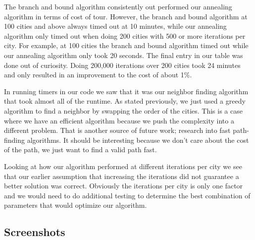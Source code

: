 \documentclass{article}
\begin{document}
    \begin{multicols}{2}
        The branch and bound algorithm consistently out performed our annealing algorithm in terms of cost of tour. However, the branch and bound algorithm at 100 cities and above always timed out at 10 minutes, while our annealing algorithm only timed out when doing 200 cities with 500 or more iterations per city. For example, at 100 cities the branch and bound algorithm timed out while our annealing algorithm only took 20 seconds. The final entry in our table was done out of curiosity. Doing 200,000 iterations over 200 cities took 24 minutes and only resulted in an improvement to the cost of about 1\%.

        In running timers in our code we saw that it was our neighbor finding algorithm that took almost all of the runtime. As stated previously, we just used a greedy algorithm to find a neighbor by swapping the order of the cities. This is a case where we have an efficient algorithm because we push the complexity into a different problem. That is another source of future work; research into fast path-finding algorithms. It should be interesting because we don't care about the cost of the path, we just want to find a valid path fast.

        Looking at how our algorithm performed at different iterations per city we see that our earlier assumption that increasing the iterations did not guarantee a better solution was correct. Obviously the iterations per city is only one factor and we would need to do additional testing to determine the best combination of parameters that would optimize our algorithm.
    \end{multicols}

\pagebreak
\subsection{Screenshots}
\end{document}
